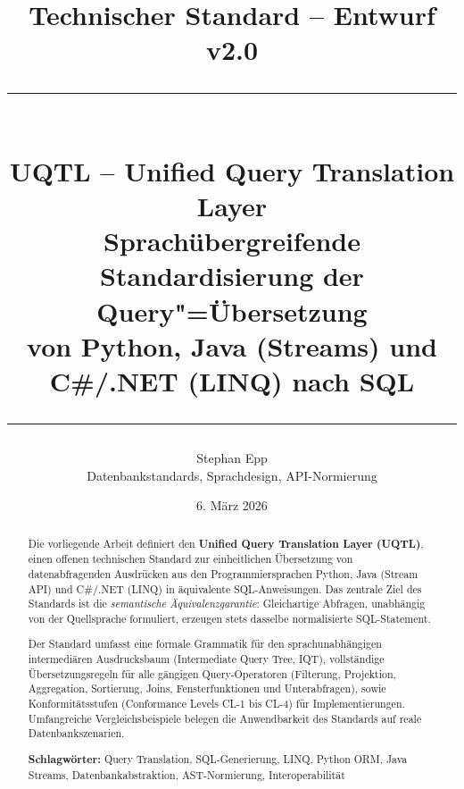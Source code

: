 ﻿\documentclass[12pt,a4paper]{article}
\title{%
  \vspace{-1cm}%
  {\large Technischer Standard -- Entwurf v2.0}\\[0.5em]
  \rule{\linewidth}{0.6pt}\\[0.5em]
  {\LARGE\bfseries UQTL -- Unified Query Translation Layer}\\[0.3em]
  {\large Sprachübergreifende Standardisierung der Query"=Übersetzung\\
  von Python, Java (Streams) und C\#/.NET (LINQ) nach SQL}\\[0.5em]
  \rule{\linewidth}{0.6pt}%
}
\author{%
  Stephan Epp\\[0.3em]
  \small Datenbankstandards, Sprachdesign, API-Normierung
}
\date{6. März 2026}
\theoremstyle{definition}
\theoremstyle{plain}
\theoremstyle{remark}
\begin{document}

\maketitle
\thispagestyle{empty}

\begin{abstract}
\noindent
Die vorliegende Arbeit definiert den \textbf{Unified Query Translation Layer (UQTL)},
einen offenen technischen Standard zur einheitlichen Übersetzung von
datenabfragenden Ausdrücken aus den Programmiersprachen Python, Java (Stream API)
und C\#/.NET (LINQ) in äquivalente SQL-Anweisungen. Das zentrale Ziel des Standards
ist die \emph{semantische Äquivalenzgarantie}: Gleichartige Abfragen, unabhängig
von der Quellsprache formuliert, erzeugen stets dasselbe normalisierte SQL-Statement.

Der Standard umfasst eine formale Grammatik für den sprachunabhängigen intermediären
Ausdrucksbaum (Intermediate Query Tree, IQT), vollständige Übersetzungsregeln
für alle gängigen Query-Operatoren (Filterung, Projektion, Aggregation,
Sortierung, Joins, Fensterfunktionen und Unterabfragen), sowie Konformitätsstufen
(Conformance Levels CL-1 bis CL-4) für Implementierungen. Umfangreiche
Vergleichsbeispiele belegen die Anwendbarkeit des Standards auf reale
Datenbankszenarien.

\medskip
\noindent\textbf{Schlagwörter:} Query Translation, SQL-Generierung, LINQ, Python ORM,
Java Streams, Datenbankabstraktion, AST-Normierung, Interoperabilität
\end{abstract}

\newpage
\tableofcontents
\newpage


\newpage

\newpage

\newpage

\newpage

\newpage

\newpage

\newpage

\newpage

\newpage


\end{document}
